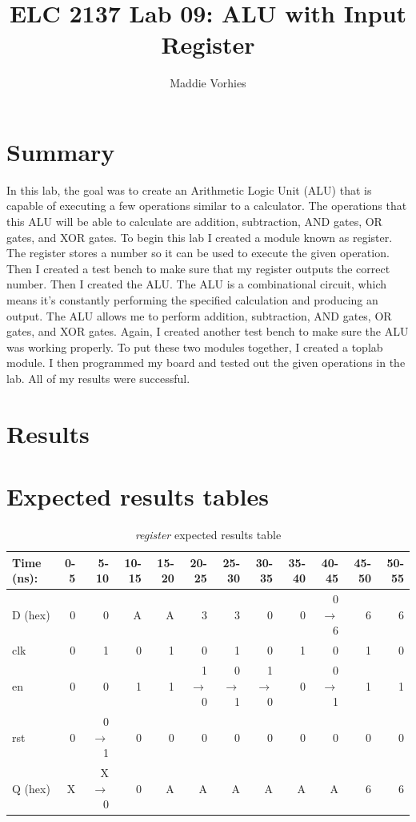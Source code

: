 \documentclass[11pt]{article}
\begin{document}
\title{ELC 2137 Lab 09: ALU with Input Register}
\author{Maddie Vorhies}

\maketitle


\section*{Summary}

 In this lab, the goal was to create an Arithmetic Logic Unit (ALU) that is capable of executing a few operations similar to a calculator. The operations that this ALU will be able to calculate are addition, subtraction, AND gates, OR gates, and XOR gates. To begin this lab I created a module known as register. The register stores a number so it can be used to execute the given operation. Then I created a test bench to make sure that my register outputs the correct number. Then I created the ALU. The ALU is a combinational circuit, which means it's constantly performing the specified calculation and producing an output. The ALU allows me to perform addition, subtraction, AND gates, OR gates, and XOR gates. Again, I created another test bench to make sure the ALU was working properly. To put these two modules together, I created a toplab module. I then programmed my board and tested out the given operations in the lab. All of my results were successful. 


\section*{Results}

\section*{Expected results tables}

\begin{table}[ht]\centering
	\caption{\textit{register} expected results table}
	\label{ALU:tbl:register_ERT}\medskip
	\begin{tabular}{l|rrrrrrrrrrr}
		Time (ns): & 0-5 & 5-10 & 10-15 & 15-20 & 20-25 & 25-30 & 30-35 & 35-40 & 40-45 & 45-50 & 50-55 \\
		\midrule
		D (hex) & 0 & 0 	  & A & A & 3 	    & 3 	  & 0 	    & 0 & 0$\to$6 & 6 & 6 \\
		clk     & 0 & 1 	  & 0 & 1 & 0 	    & 1 	  & 0 	    & 1 & 0 	  & 1 & 0 \\
		en  	& 0 & 0 	  & 1 & 1 & 1$\to$0 & 0$\to$1 & 1$\to$0 & 0 & 0$\to$1 & 1 & 1 \\
		rst 	& 0 & 0$\to$1 & 0 & 0 & 0 		& 0 	  & 0		& 0 & 0		  & 0 & 0 \\
		\midrule
		Q (hex) & X & X$\to$0 & 0 & A & A & A & A & A & A & 6 & 6\\
		\bottomrule
	\end{tabular}
\end{table}
\end{document}
